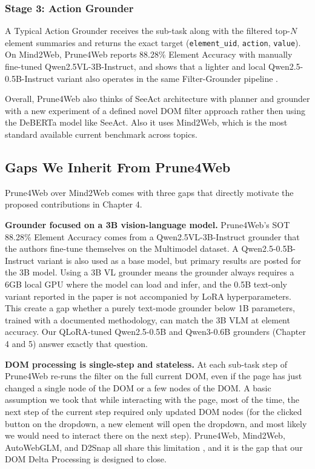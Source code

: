     \subsubsection{Stage 3: Action Grounder}
    A Typical Action Grounder receives the sub-task along with the filtered top-$N$ element summaries and returns the exact target (\texttt{element\_uid}, \texttt{action}, \texttt{value}). On Mind2Web, Prune4Web reports 88.28\% Element Accuracy with manually fine-tuned Qwen2.5VL-3B-Instruct, and shows that a lighter and local Qwen2.5-0.5B-Instruct variant also operates in the same Filter-Grounder pipeline \cite{zhang2025prune4web}.
    

\noindent Overall, Prune4Web also thinks of SeeAct architecture with planner and grounder with a new experiment of a defined novel DOM filter approach rather then using the DeBERTa model like SeeAct. Also it uses Mind2Web, which is the most standard available current benchmark across topics.


\subsection{Gaps We Inherit From Prune4Web}

Prune4Web over Mind2Web comes with three gaps that directly motivate the proposed contributions in Chapter 4.

\textbf{Grounder focused on a 3B vision-language model.}
Prune4Web's SOT 88.28\% Element Accuracy comes from a Qwen2.5VL-3B-Instruct grounder that the authors fine-tune themselves on the Multimodel dataset. A Qwen2.5-0.5B-Instruct variant is also used as a base model, but primary results are posted for the 3B model\cite{zhang2025prune4web}. Using a 3B VL grounder means the grounder always requires a 6GB local GPU where the model can load and infer, and the 0.5B text-only variant reported in the paper is not accompanied by LoRA hyperparameters. This create a gap whether a purely text-mode grounder below 1B parameters, trained with a documented methodology, can match the 3B VLM at element accuracy. Our QLoRA-tuned Qwen2.5-0.5B and Qwen3-0.6B grounders (Chapter 4 and 5) answer exactly that question.

\textbf{DOM processing is single-step and stateless.}
At each sub-task step of Prune4Web re-runs the filter on the full current DOM, even if the page has just changed a single node of the DOM or a few nodes of the DOM. A basic assumption we took that while interacting with the page, most of the time, the next step of the current step required only updated DOM nodes (for the clicked button on the dropdown, a new element will open the dropdown, and most likely we would need to interact there on the next step). Prune4Web, Mind2Web, AutoWebGLM, and D2Snap all share this limitation \cite{zhang2025prune4web} \cite{deng2023mind2webgeneralistagentweb} \cite{lai2024autowebglm} \cite{schiepanski2025d2snap}, and it is the gap that our DOM Delta Processing is designed to close.


